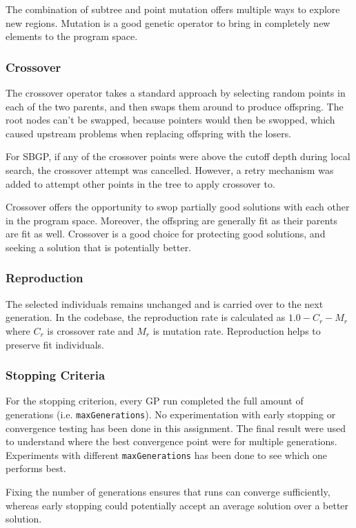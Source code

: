 \documentclass{article}
\begin{document}
The combination of subtree and point mutation offers multiple ways to explore new regions. Mutation is a good genetic operator to bring in completely new elements to the program space.

\subsubsection{Crossover}
The crossover operator takes a standard approach by selecting random points in each of the two parents, and then swaps them around to produce offspring. The root nodes can't be swapped, because pointers would then be swopped, which caused upstream problems when replacing offspring with the losers.

For SBGP, if any of the crossover points were above the cutoff depth during local search, the crossover attempt was cancelled. However, a retry mechanism was added to attempt other points in the tree to apply crossover to.

Crossover offers the opportunity to swop partially good solutions with each other in the program space. Moreover, the offspring are generally fit as their parents are fit as well. Crossover is a good choice for protecting good solutions, and seeking a solution that is potentially better.

\subsubsection{Reproduction}
The selected individuals remains unchanged and is carried over to the next generation. In the codebase, the reproduction rate is calculated as \(1.0-C_r-M_r\) where \(C_r\) is crossover rate and \(M_r\) is mutation rate. Reproduction helps to preserve fit individuals.

\subsubsection{Stopping Criteria}
For the stopping criterion, every GP run completed the full amount of generations (i.e. \texttt{maxGenerations}). No experimentation with early stopping or convergence testing has been done in this assignment. The final result were used to understand where the best convergence point were for multiple generations. Experiments with different \texttt{maxGenerations} has been done to see which one performs best.

Fixing the number of generations ensures that runs can converge sufficiently, whereas early stopping could potentially accept an average solution over a better solution.
\end{document}
